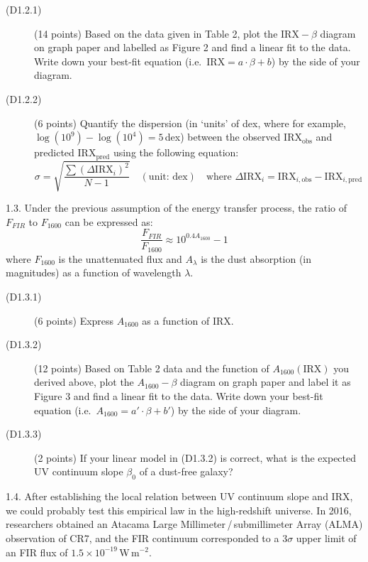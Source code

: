 \begin{description}
\item[(D1.2.1)] (14 points) Based on the data given in Table 2, plot the
  $\mathrm{IRX}-\beta$ diagram on graph paper and labelled as Figure 2 and
  find a linear fit to the data. Write down your best-fit equation (i.e.\
  $\mathrm{IRX} = a \cdot \beta + b$) by the side of your diagram.
\item[(D1.2.2)] (6 points) Quantify the dispersion (in `units' of dex, where
  for example, $\log(10^9) - \log(10^4) = 5$\,dex) between the observed
  $\mathrm{IRX}_{\mathrm{obs}}$ and predicted $\mathrm{IRX}_{\mathrm{pred}}$
  using the following equation:
  \[ \sigma = \sqrt{\frac{\sum (\Delta\mathrm{IRX}_i)^2}{N-1}}
     \quad (\text{unit: dex}) \quad \text{where }
     \Delta\mathrm{IRX}_i = \mathrm{IRX}_{i,\mathrm{obs}}
       - \mathrm{IRX}_{i,\mathrm{pred}} \]
\end{description}

1.3. Under the previous assumption of the energy transfer process, the ratio
of $F_{FIR}$ to $F_{1600}$ can be expressed as:
\[ \frac{F_{FIR}}{F_{1600}} \approx 10^{0.4 A_{1600}} - 1 \]
where $F_{1600}$ is the unattenuated flux and $A_\lambda$ is the dust
absorption (in magnitudes) as a function of wavelength $\lambda$.

\begin{description}
\item[(D1.3.1)] (6 points) Express $A_{1600}$ as a function of IRX.
\item[(D1.3.2)] (12 points) Based on Table 2 data and the function of
  $A_{1600}(\mathrm{IRX})$ you derived above, plot the $A_{1600}-\beta$
  diagram on graph paper and label it as Figure 3 and find a linear fit to the
  data. Write down your best-fit equation (i.e.\
  $A_{1600} = a' \cdot \beta + b'$) by the side of your diagram.
\item[(D1.3.3)] (2 points) If your linear model in (D1.3.2) is correct, what
  is the expected UV continuum slope $\beta_0$ of a dust-free galaxy?
\end{description}

1.4. After establishing the local relation between UV continuum slope and IRX,
we could probably test this empirical law in the high-redshift universe. In
2016, researchers obtained an Atacama Large Millimeter\,/\,submillimeter Array
(ALMA) observation of CR7, and the FIR continuum corresponded to a $3\sigma$
upper limit of an FIR flux of $1.5 \times 10^{-19}$\,W\,m$^{-2}$.

